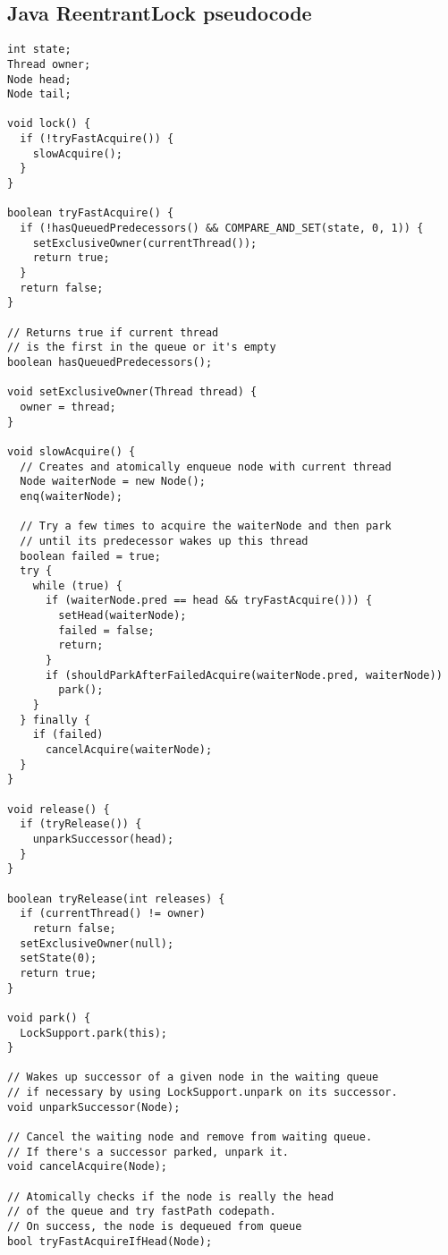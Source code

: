 \begin{appendices}

\chapter{Java ReentrantLock pseudocode}

\noindent
\begin{verbatim}
int state;
Thread owner;
Node head;
Node tail;

void lock() {
  if (!tryFastAcquire()) {
    slowAcquire();
  }
}

boolean tryFastAcquire() {
  if (!hasQueuedPredecessors() && COMPARE_AND_SET(state, 0, 1)) {
    setExclusiveOwner(currentThread());
    return true;
  }
  return false;	
}

// Returns true if current thread
// is the first in the queue or it's empty
boolean hasQueuedPredecessors();

void setExclusiveOwner(Thread thread) {
  owner = thread;
}

void slowAcquire() {
  // Creates and atomically enqueue node with current thread
  Node waiterNode = new Node();
  enq(waiterNode);

  // Try a few times to acquire the waiterNode and then park
  // until its predecessor wakes up this thread
  boolean failed = true;
  try {
    while (true) {
      if (waiterNode.pred == head && tryFastAcquire())) {
        setHead(waiterNode);
        failed = false;
        return;
      }
      if (shouldParkAfterFailedAcquire(waiterNode.pred, waiterNode))
        park();
    }
  } finally {
    if (failed)
      cancelAcquire(waiterNode);
  }
}

void release() {
  if (tryRelease()) {
    unparkSuccessor(head);
  }
}

boolean tryRelease(int releases) {
  if (currentThread() != owner)
    return false;
  setExclusiveOwner(null);
  setState(0);
  return true;
}

void park() {
  LockSupport.park(this);
}

// Wakes up successor of a given node in the waiting queue
// if necessary by using LockSupport.unpark on its successor.
void unparkSuccessor(Node);

// Cancel the waiting node and remove from waiting queue.
// If there's a successor parked, unpark it.
void cancelAcquire(Node);

// Atomically checks if the node is really the head
// of the queue and try fastPath codepath.
// On success, the node is dequeued from queue
bool tryFastAcquireIfHead(Node);


\end{verbatim}
\end{appendices}
